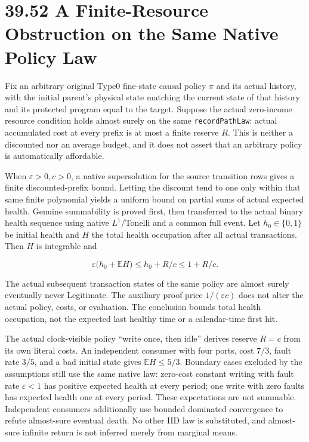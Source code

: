 \documentclass[
  english,
  11pt,
  oneside]{book}
\begin{document}
\section{39.52 A Finite-Resource Obstruction on the Same Native Policy Law}\label{a-finite-resource-obstruction-on-the-same-native-policy-law}

Fix an arbitrary original Type0 fine-state causal policy \(\pi\) and its actual history, with the initial parent's physical state matching the current state of that history and its protected program equal to the target. Suppose the actual zero-income resource condition holds almost surely on the same \nolinkurl{recordPathLaw}: actual accumulated cost at every prefix is at most a finite reserve \(R\). This is neither a discounted nor an average budget, and it does not assert that an arbitrary policy is automatically affordable.

When \(\varepsilon>0,c>0\), a native supersolution for the source transition rows gives a finite discounted-prefix bound. Letting the discount tend to one only within that same finite polynomial yields a uniform bound on partial sums of actual expected health. Genuine summability is proved first, then transferred to the actual binary health sequence using native \(L^1\)/Tonelli and a common full event. Let \(h_0\in\{0,1\}\) be initial health and \(H\) the total health occupation after all actual transactions. Then \(H\) is integrable and

\[\varepsilon\bigl(h_0+\mathbb E H\bigr)
\le h_0+R/c\le 1+R/c.\]

The actual subsequent transaction states of the same policy are almost surely eventually never Legitimate. The auxiliary proof price \(1/(\varepsilon c)\) does not alter the actual policy, costs, or evaluation. The conclusion bounds total health occupation, not the expected last healthy time or a calendar-time first hit.

The actual clock-visible policy ``write once, then idle'' derives reserve \(R=c\) from its own literal costs. An independent consumer with four ports, cost \(7/3\), fault rate \(3/5\), and a bad initial state gives \(\mathbb E H\le5/3\). Boundary cases excluded by the assumptions still use the same native law: zero-cost constant writing with fault rate \(\varepsilon<1\) has positive expected health at every period; one write with zero faults has expected health one at every period. These expectations are not summable. Independent consumers additionally use bounded dominated convergence to refute almost-sure eventual death. No other IID law is substituted, and almost-sure infinite return is not inferred merely from marginal means.
\end{document}
